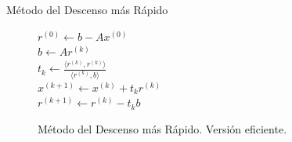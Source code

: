 \documentclass[10pt]{beamer}
\begin{document}
\begin{frame}{M\'etodo del Descenso m\'as R\'apido}
  \begin{figure}[h]    
    \begin{algorithm}[H]     
     \caption{M\'etodo del Descenso m\'as R\'apido. Versi\'on eficiente.}
    $r^{(0)} \leftarrow b -Ax^{(0)}$\\
     {
       $b \leftarrow Ar^{(k)}$\\
       $t_k \leftarrow \displaystyle\frac{\langle r^{(k)},r^{(k)}\rangle}{\langle r^{(k)},b\rangle}$\\
       $x^{(k+1)} \leftarrow x^{(k)}+t_kr^{(k)}$  \\
       $r^{(k+1)} \leftarrow r^{(k)}-t_kb$
    }    
    \end{algorithm}
    \end{figure}
\end{frame}
\end{document}
